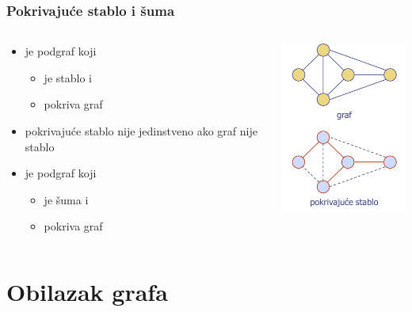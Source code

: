 \documentclass[compress,aspectratio=169]{beamer}
\begin{document}
\begin{frame}[fragile]
  \frametitle{Pokrivajuće stablo i šuma}
  \begin{columns}
    \begin{column}[t]{6cm}
      \begin{itemize}
        \item {} je podgraf koji
        \begin{itemize}
          \item je stablo i
          \item pokriva graf
        \end{itemize}
        \item pokrivajuće stablo nije jedinstveno ako graf nije stablo
        \item {} je podgraf koji
        \begin{itemize}
          \item je šuma i
          \item pokriva graf
        \end{itemize}
      \end{itemize}
    \end{column}
    \begin{column}[t]{6cm}
      \begin{center}
        \includegraphics[width=4.5cm]{asp-14-pic17.png}
      \end{center}
    \end{column}
  \end{columns}
\end{frame}

\section[Obilazak grafa]{Obilazak grafa}
\end{document}
